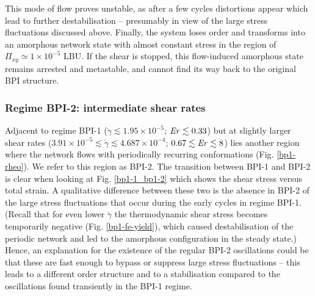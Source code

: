 \documentclass[8.5pt,twoside,twocolumn]{article}
\newcommand{\e}[1]{\times10^{#1}}
\newcommand{\gd}{\dot{\gamma}}
\begin{document}
This mode of flow proves unstable, as after a few cycles 
distortions appear which lead to further destabilisation -- presumably in
view of the large stress fluctuations discussed above. 
Finally, the system loses order and 
transforms into an amorphous network state with almost constant
stress in the region of $\Pi_{xy}\simeq 1\e{-5}$ LBU.
If the shear is stopped, this flow-induced amorphous state
remains arrested and metastable, and cannot
find its way back to the original BPI structure.

\subsubsection{Regime BPI-2: intermediate shear rates }

Adjacent to regime BPI-1 ($\gd\lesssim1.95\e{-5}$; $ {\it Er}\lesssim 0.33$) but 
at slightly larger shear rates ($3.91\e{-5}\lesssim\gd\lesssim 4.687\e{-4}$; $0.67\lesssim{\it Er}\lesssim8$)
lies another region where the network flows with periodically 
recurring conformations (Fig. \ref{bp1-rheo}). 
We refer to this region as BPI-2. The transition between BPI-1 and BPI-2 
is clear when looking at Fig. \ref{bp1-1_bp1-2} 
which shows the shear stress versus total strain. 
A qualitative difference between these two is the absence in BPI-2 of the 
large stress fluctuations that occur during the early cycles in regime BPI-1.
(Recall that for even lower $\gd$ the thermodynamic shear stress becomes 
temporarily negative (Fig. \ref{bp1-fe-yield}), which 
caused destabilisation of the periodic network and led to the 
amorphous configuration in the steady state.)
Hence, an explanation
for the existence of the regular BPI-2 oscillations 
could be that these are fast enough to bypass or suppress 
large stress fluctuations -- this leads to
a different order structure and to a stabilisation 
compared to the oscillations found transiently in
the BPI-1 regime.
\end{document}
